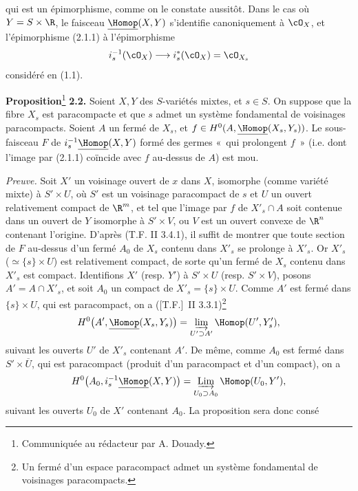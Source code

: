 qui est un
épimorphisme, comme on le constate aussitôt. Dans le cas où $Y=S\times\R$, le faisceau $\underline{\Homop}(X,Y)$ s'identifie canoniquement à $\cO_X$, et l'épimorphisme (2.1.1) à l'épimorphisme
\[
  i_s^{-1}(\cO_X)\longrightarrow i_s^*(\cO_X)=\cO_{X_s}
\]
considéré en (1.1).

\textbf{Proposition}\footnote{Communiquée au rédacteur par A. Douady.} \textbf{2.2.} Soient $X,Y$ des $S$-variétés mixtes, et $s\in S$. On suppose que la fibre $X_s$ est paracompacte et que $s$ admet un système fondamental de voisinages paracompacts. Soient $A$ un fermé de $X_s$, et $f\in H^0(A,\underline{\Homop}(X_s,Y_s))$.
Le sous-faisceau $F$ de $i_s^{-1}\underline{\Homop}(X,Y)$ formé des germes «~qui prolongent $f$~» (i.e. dont l'image par (2.1.1) coïncide avec $f$ au-dessus de $A$) est mou.

\emph{Preuve.} Soit $X'$ un voisinage ouvert de $x$ dans $X$, isomorphe (comme variété mixte) à $S'\times U$, où $S'$ est un voisinage paracompact de $s$ et $U$ un ouvert relativement compact de $\R^m$, et tel que l'image par $f$ de $X'_s\cap A$ soit contenue dans un ouvert de $Y$ isomorphe à $S'\times V$, ou $V$ est un ouvert convexe de $\R^n$ contenant l'origine. D'après (T.F. II 3.4.1), il suffit de montrer que toute section de $F$ au-dessus d'un fermé $A_0$ de $X_s$ contenu dans $X'_s$ se prolonge à $X'_s$. Or $X'_s$ ($\simeq\{s\}\times U$) est relativement compact, de sorte qu'un fermé de $X_s$ contenu dans $X'_s$ est compact. Identifions $X'$ (resp. $Y'$) à $S'\times U$ (resp. $S'\times V$), posons $A'=A\cap X'_s$, et soit $A_0$ un compact de $X'_s=\{s\}\times U$. Comme $A'$ est fermé dans $\{s\}\times U$, qui est paracompact, on a ([T.F.]~II 3.3.1)\footnote{Un fermé d'un espace paracompact admet un système fondamental de voisinages paracompacts.}
\[
  H^0\bigl(A',\underline{\Homop}(X_s,Y_s)\bigr)
  =\varinjlim_{U'\supset A'}\Homop(U',Y'_s),
\]
suivant les ouverts $U'$ de $X'_s$ contenant $A'$. De même, comme $A_0$ est fermé dans $S'\times \overline U$, qui est paracompact (produit d'un paracompact et d'un compact), on a
\[
  H^0\bigl(A_0,i_s^{-1}\underline{\Homop}(X,Y)\bigr)
  =\mathop{\underrightarrow{\mathrm{Lim}}}\limits_{U_0\supset A_0}\Homop(U_0,Y'),
\]
suivant les ouverts $U_0$ de $X'$ contenant $A_0$. La proposition sera donc
consé%
